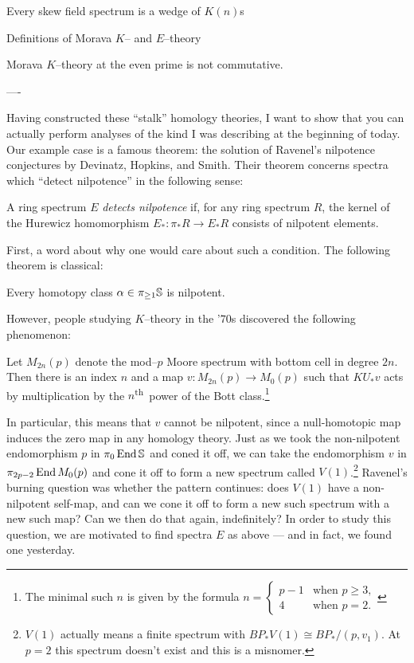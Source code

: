 Every skew field spectrum is a wedge of $K(n)$s

Definitions of Morava $K$-- and $E$--theory

\begin{remark}
Morava $K$--theory at the even prime is not commutative.
\end{remark}

----

Having constructed these ``stalk'' homology theories, I want to show that you can actually perform analyses of the kind I was describing at the beginning of today.  Our example case is a famous theorem: the solution of Ravenel's nilpotence conjectures by Devinatz, Hopkins, and Smith.  Their theorem concerns spectra which ``detect nilpotence'' in the following sense:

\begin{definition}
A ring spectrum $E$ \textit{detects nilpotence} if, for any ring spectrum $R$, the kernel of the Hurewicz homomorphism $E_*: \pi_* R \to E_* R$ consists of nilpotent elements.
\end{definition}

First, a word about why one would care about such a condition.  The following theorem is classical:
\begin{theorem}[Nishida]
Every homotopy class $\alpha \in \pi_{\ge 1} \S$ is nilpotent.
\end{theorem}

\noindent However, people studying $K$--theory in the '$70$s discovered the following phenomenon:

\begin{theorem}[Adams]
Let $M_{2n}(p)$ denote the mod--$p$ Moore spectrum with bottom cell in degree $2n$.  Then there is an index $n$ and a map $v: M_{2n}(p) \to M_0(p)$ such that $KU_* v$ acts by multiplication by the $n$\textsuperscript{th}\, power of the Bott class.\footnote{The minimal such $n$ is given by the formula $n = \begin{cases} p-1 & \text{when $p \ge 3$}, \\ 4 & \text{when $p = 2$}. \end{cases}$}
\end{theorem}

\noindent In particular, this means that $v$ cannot be nilpotent, since a null-homotopic map induces the zero map in any homology theory.  Just as we took the non-nilpotent endomorphism $p$ in $\pi_0 \End \S$ and coned it off, we can take the endomorphism $v$ in $\pi_{2p-2} \End M_0(p)$ and cone it off to form a new spectrum called $V(1)$.\footnote{$V(1)$ actually means a finite spectrum with $BP_* V(1) \cong BP_* / (p, v_1)$. At $p = 2$ this spectrum doesn't exist and this is a misnomer.}  Ravenel's burning question was whether the pattern continues: does $V(1)$ have a non-nilpotent self-map, and can we cone it off to form a new such spectrum with a new such map?  Can we then do that again, indefinitely?  In order to study this question, we are motivated to find spectra $E$ as above --- and in fact, we found one yesterday.

